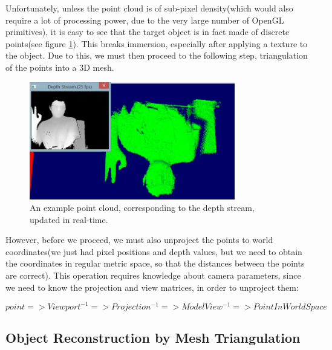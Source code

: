 \documentclass[]{article}
\begin{document}
Unfortunately, unless the point cloud is of sub-pixel density(which would also require a lot of processing power, due to the very large number of OpenGL primitives), it is easy to see that the target object is in fact made of discrete points(see figure \ref{fig:PointCloud}). This breaks immersion, especially after applying a texture to the object. Due to this, we must then proceed to the following step, triangulation of the points into a 3D mesh.

\begin{figure}[hbtp]
    \centering
    \includegraphics[width=0.8\textwidth]{figures/PointCloud.PNG}
    \caption{An example point cloud, corresponding to the depth stream, updated in real-time.}
    \label{fig:PointCloud}
\end{figure}

 However, before we proceed, we must also unproject the points to world coordinates(we just had pixel positions and depth values, but we need to obtain the coordinates in regular metric space, so that the distances between the points are correct). This operation requires knowledge about camera parameters, since we need to know the projection and view matrices, in order to unproject them:

$$point => Viewport^{-1} => Projection^{-1} => ModelView^{-1} => PointInWorldSpace$$



\subsection{Object Reconstruction by Mesh Triangulation}
\end{document}

